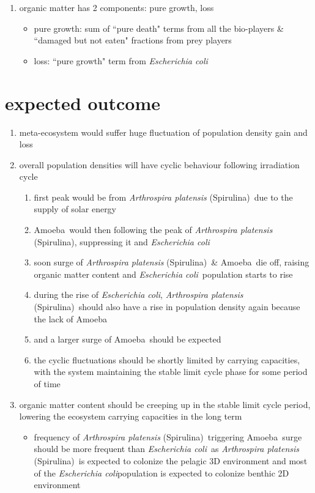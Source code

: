 \documentclass[a4paper,11pt]{article}
\newcommand{\ec}{\textit{Escherichia coli}}
\newcommand{\am}{Amoeba}
\newcommand{\ap}{\textit{Arthrospira platensis} (Spirulina)}
\begin{document}
\begin{enumerate}
        \item organic matter has 2 components: pure growth, loss
        \begin{itemize}
            \item pure growth: sum of ``pure death" terms from all the bio-players \& ``damaged but not eaten" fractions from prey players
            \item loss: ``pure growth" term from \ec
        \end{itemize}
    \end{enumerate}
    
    \section{expected outcome}
    \begin{enumerate}
        \item meta-ecosystem would suffer huge fluctuation of population density gain and loss
        \item overall population densities will have cyclic behaviour following irradiation cycle
        \begin{enumerate}
            \item first peak would be from \ap\ due to the supply of solar energy
            \item \am\ would then following the peak of \ap, suppressing it and \ec
            \item soon surge of \ap\ \& \am\ die off, raising organic matter content and \ec\ population starts to rise
            \item during the rise of \ec, \ap\ should also have a rise in population density again because the lack of \am
            \item and a larger surge of \am\ should be expected
            \item the cyclic fluctuations should be shortly limited by carrying capacities, with the system maintaining the stable limit cycle phase for some period of time
        \end{enumerate}
        \item organic matter content should be creeping up in the stable limit cycle period, lowering the ecosystem carrying capacities in the long term
        \begin{itemize}
            \item frequency of \ap\ triggering \am\ surge should be more frequent than \ec\ as \ap\ is expected to colonize the pelagic 3D environment and most of the \ec population is expected to colonize benthic 2D environment

\end{itemize}
\end{enumerate}
\end{document}
